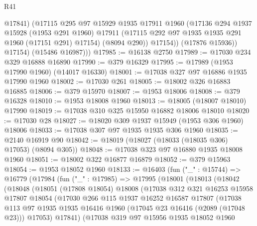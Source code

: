 \begin{lexlean}{R41}
\begin{coremodule}
                @17841)
              (@17115
                @295
                @97
                @15929
                @1935
                @17911
                @1960
                (@17136
                  @294
                  @1937
                  @15928
                  (@1953 @291 @1960)
                  @17911
                  (@17115 @292 @97 @1935 @1935 @291 @1960 (@17151 @291) @17154)
                  (@8094 @290))
                @17154))
            (@17876 @15936))
          @17154)
        (@15486 @16987)))
@17985 := @16138 @2750
@17989 := @17030 @234 @329 @16888 @16890
@17990 := @379 @16329
@17995 := @17989 (@1953 @17990 @1960) (@14017 @16330)
@18001 := @17038 @327 @97 @16886 @1935 @17990 @1960
@18002 := @17030 @261
@18005 := @18002 @326 @16883 @16885
@18006 := @379 @15970
@18007 := @1953 @18006
@18008 := @379 @16328
@18010 := @1953 @18008 @1960
@18013 := @18005 (@18007 @18010) @17990
@18019 := @17038 @310 @325 @15950 @16882 @18006 @18010
@18020 := @17030 @28
@18027 := @18020 @309 @1937 @15949 (@1953 @306 @1960) @18006
@18033 := @17038 @307 @97 @1935 @1935 @306 @1960
@18035 := @2140 @16919 @90
@18042 := @18019 (@18027 (@18033 (@18035 @306) @17053) (@8094 @305))
@18048 := @17038 @323 @97 @16880 @1935 @18008 @1960
@18051 := @18002 @322 @16877 @16879
@18052 := @379 @15963
@18054 := @1953 @18052 @1960
@18133 := @16403
    (fun ("_" : @15744) =>
    @16779
      (@17984
        (fun ("_" : @17985) =>
        @17995
          (@18001
            (@18013
              (@18042
                (@18048
                  (@18051
                    (@17808 @18054)
                    @18008
                    (@17038
                      @312
                      @321
                      @16253
                      @15958
                      @17807
                      @18054
                      (@17030
                        @266
                        @115
                        @1937
                        @16252
                        @16587
                        @17807
                        (@17038
                          @113
                          @97
                          @1935
                          @1935
                          @16416
                          @1960
                          (@17045 @23 @16416 (@2089 (@17048 @23)))
                          @17053)
                        @17841)
                      (@17038
                        @319
                        @97
                        @15956
                        @1935
                        @18052
                        @1960

\end{coremodule}
\end{lexlean}
